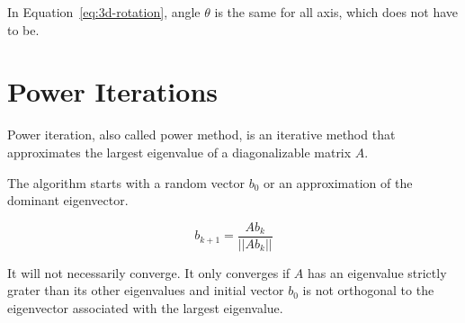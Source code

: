 In Equation~\ref{eq:3d-rotation}, angle $\theta$ is the same for all axis, which does not have to be.


\section{Power Iterations}
\label{sec:powerIterations}

Power iteration, also called power method, is an iterative method
that approximates the largest eigenvalue of a diagonalizable matrix $A$.

The algorithm starts with a random vector $b_0$ or an approximation of the dominant eigenvector.

\begin{equation}
    \label{eq:powerIterations}
    b_{k+1} = \frac{Ab_k}{||Ab_k||}
\end{equation}

It will not necessarily converge. It only converges if $A$ has an eigenvalue strictly grater than its other eigenvalues
and initial vector $b_0$ is not orthogonal to the eigenvector associated with the largest eigenvalue.
